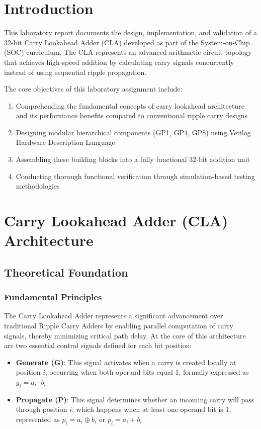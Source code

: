 \documentclass[a4paper, 11pt]{article}
\begin{document}
\section{Introduction}

This laboratory report documents the design, implementation, and validation of a 32-bit Carry Lookahead Adder (CLA) developed as part of the System-on-Chip (SOC) curriculum. The CLA represents an advanced arithmetic circuit topology that achieves high-speed addition by calculating carry signals concurrently instead of using sequential ripple propagation.

The core objectives of this laboratory assignment include:
\begin{enumerate}
    \item Comprehending the fundamental concepts of carry lookahead architecture and its performance benefits compared to conventional ripple carry designs
    \item Designing modular hierarchical components (GP1, GP4, GP8) using Verilog Hardware Description Language
    \item Assembling these building blocks into a fully functional 32-bit addition unit
    \item Conducting thorough functional verification through simulation-based testing methodologies
\end{enumerate}

\section{Carry Lookahead Adder (CLA) Architecture}

\subsection{Theoretical Foundation}

\subsubsection{Fundamental Principles}

The Carry Lookahead Adder represents a significant advancement over traditional Ripple Carry Adders by enabling parallel computation of carry signals, thereby minimizing critical path delay. At the core of this architecture are two essential control signals defined for each bit position:

\begin{itemize}
    \item \textbf{Generate (G)}: This signal activates when a carry is created locally at position $i$, occurring when both operand bits equal 1, formally expressed as $g_i = a_i \cdot b_i$
    \item \textbf{Propagate (P)}: This signal determines whether an incoming carry will pass through position $i$, which happens when at least one operand bit is 1, represented as $p_i = a_i \oplus b_i$ or $p_i = a_i + b_i$
\end{itemize}
\end{document}

